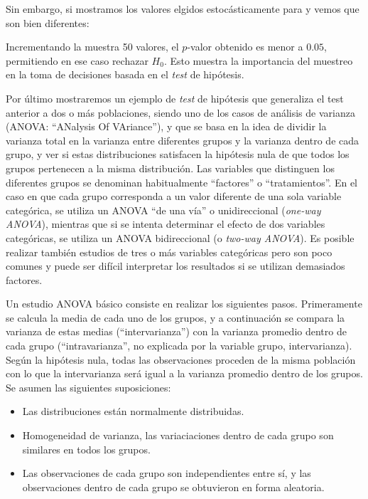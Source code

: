 
Sin embargo, si mostramos los valores elgidos estocásticamente para  y  vemos que son bien diferentes:


Incrementando la muestra 50 valores, el $p$-valor obtenido es menor a $0.05$, permitiendo en ese caso rechazar $H_0$. Esto muestra la importancia del muestreo en la toma de decisiones basada en el \textit{test} de hipótesis.


Por último mostraremos un ejemplo de \textit{test} de hipótesis que generaliza el test anterior a dos o más poblaciones, siendo uno de los casos de análisis de varianza (ANOVA: ``ANalysis Of VAriance''), y que se basa en la idea de dividir la varianza total en la varianza entre diferentes grupos y la varianza dentro de cada grupo, y ver si estas distribuciones satisfacen la hipótesis nula de que todos los grupos pertenecen a la misma distribución. Las variables que distinguen los diferentes grupos se denominan habitualmente ``factores'' o ``tratamientos''. En el caso en que cada grupo corresponda a un valor diferente de una sola variable categórica, se utiliza un ANOVA ``de una vía'' o unidireccional (\textit{one-way ANOVA}), mientras que si se intenta determinar el efecto de dos variables categóricas, se utiliza un ANOVA bidireccional (o \textit{two-way ANOVA}). Es posible realizar también estudios de tres o más variables categóricas pero son poco comunes y puede ser difícil interpretar los resultados si se utilizan demasiados factores.

Un estudio ANOVA básico consiste en realizar los siguientes pasos. Primeramente se calcula la media de cada uno de los grupos, y a continuación se compara la varianza de estas medias (``intervarianza'') con la varianza promedio dentro de cada grupo (``intravarianza'', no explicada por la variable grupo, intervarianza). Según la hipótesis nula, todas las observaciones proceden de la misma población con lo que la intervarianza será igual a la varianza promedio dentro de los grupos. Se asumen las siguientes suposiciones:
\begin{itemize}
 \item Las distribuciones están normalmente distribuidas.
 \item Homogeneidad de varianza, las variaciaciones dentro de cada grupo son similares en todos los grupos.
 \item Las observaciones de cada grupo son independientes entre sí, y las observaciones dentro de cada grupo se obtuvieron en forma aleatoria.
\end{itemize}

